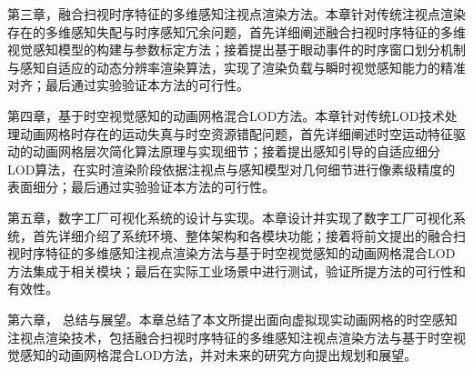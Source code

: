 第三章，融合扫视时序特征的多维感知注视点渲染方法。本章针对传统注视点渲染存在的多维感知失配与时序感知冗余问题，首先详细阐述融合扫视时序特征的多维视觉感知模型的构建与参数标定方法；接着提出基于眼动事件的时序窗口划分机制与感知自适应的动态分辨率渲染算法，实现了渲染负载与瞬时视觉感知能力的精准对齐；最后通过实验验证本方法的可行性。

第四章，基于时空视觉感知的动画网格混合LOD方法。本章针对传统LOD技术处理动画网格时存在的运动失真与时空资源错配问题，首先详细阐述时空运动特征驱动的动画网格层次简化算法原理与实现细节；接着提出感知引导的自适应细分LOD算法，在实时渲染阶段依据注视点与感知模型对几何细节进行像素级精度的表面细分；最后通过实验验证本方法的可行性。

第五章，数字工厂可视化系统的设计与实现。本章设计并实现了数字工厂可视化系统，首先详细介绍了系统环境、整体架构和各模块功能；接着将前文提出的融合扫视时序特征的多维感知注视点渲染方法与基于时空视觉感知的动画网格混合LOD方法集成于相关模块；最后在实际工业场景中进行测试，验证所提方法的可行性和有效性。

第六章， 总结与展望。本章总结了本文所提出面向虚拟现实动画网格的时空感知注视点渲染技术，包括融合扫视时序特征的多维感知注视点渲染方法与基于时空视觉感知的动画网格混合LOD方法，并对未来的研究方向提出规划和展望。